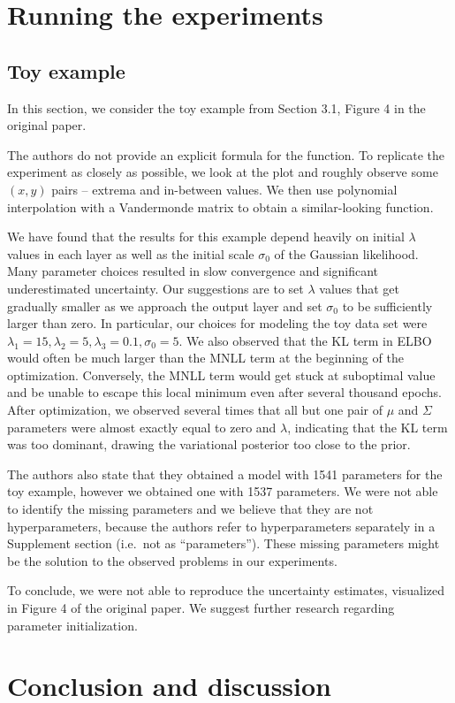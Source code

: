 \documentclass[11pt]{article}
\begin{document}
    \section{Running the experiments}\label{sec:running-the-experiments}

    \subsection{Toy example}
    In this section, we consider the toy example from Section 3.1, Figure 4 in the original paper.

    The authors do not provide an explicit formula for the function.
    To replicate the experiment as closely as possible, we look at the plot and roughly observe some $(x, y)$ pairs -- extrema and in-between values.
    We then use polynomial interpolation with a Vandermonde matrix to obtain a similar-looking function.

    We have found that the results for this example depend heavily on initial $\lambda$ values in each layer as well as the initial scale $\sigma_0$ of the Gaussian likelihood.
    Many parameter choices resulted in slow convergence and significant underestimated uncertainty.
    Our suggestions are to set $\lambda$ values that get gradually smaller as we approach the output layer and set $\sigma_0$ to be sufficiently larger than zero.
    In particular, our choices for modeling the toy data set were $\lambda_1=15, \lambda_2=5,\lambda_3=0.1, \sigma_0=5$.
    We also observed that the KL term in ELBO would often be much larger than the MNLL term at the beginning of the optimization. Conversely, the MNLL term would get stuck at suboptimal value and be unable to escape this local minimum even after several thousand epochs.
    After optimization, we observed several times that all but one pair of $\mu$ and $\Sigma$ parameters were almost exactly equal to zero and $\lambda$, indicating that the KL term was too dominant, drawing the variational posterior too close to the prior.

    The authors also state that they obtained a model with 1541 parameters for the toy example, however we obtained one with 1537 parameters.
    We were not able to identify the missing parameters and we believe that they are not hyperparameters, because the authors refer to hyperparameters separately in a Supplement section (i.e.\ not as ``parameters'').
    These missing parameters might be the solution to the observed problems in our experiments.

    To conclude, we were not able to reproduce the uncertainty estimates, visualized in Figure 4 of the original paper.
    We suggest further research regarding parameter initialization.

    \section{Conclusion and discussion}\label{sec:conclusion-and-discussion}

    
    
\end{document}
